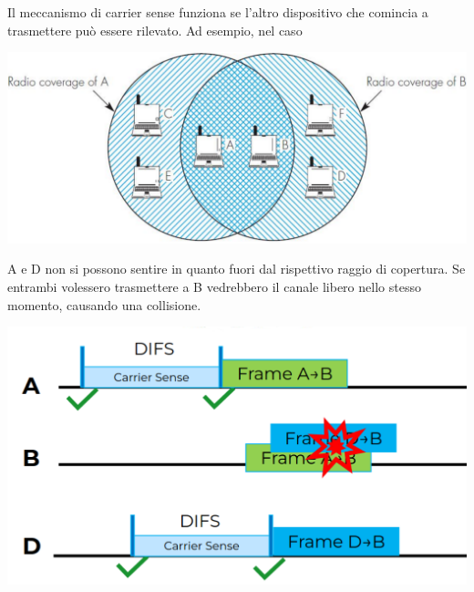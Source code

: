 Il meccanismo di carrier sense funziona se l'altro dispositivo che comincia a trasmettere può essere rilevato. Ad esempio, nel caso
\begin{center}
	\includegraphics[width=0.6\linewidth]{img/wlan/sneaky}
\end{center}
A e D non si possono sentire in quanto fuori dal rispettivo raggio di copertura. Se entrambi volessero trasmettere a B vedrebbero il canale libero nello stesso momento, causando una collisione.
\begin{center}
	\includegraphics[width=0.55\linewidth]{img/wlan/boom}
\end{center}